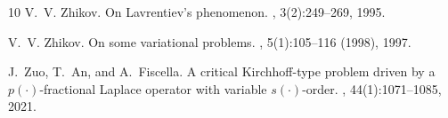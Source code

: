 \documentclass[11pt]{amsart}
\theoremstyle{plain}
\theoremstyle{definition}
\numberwithin{equation}{section}
\begin{document}
\begin{thebibliography}{10}
V.~V. Zhikov.
\newblock On {L}avrentiev's phenomenon.
, 3(2):249--269, 1995.

V.~V. Zhikov.
\newblock On some variational problems.
, 5(1):105--116 (1998), 1997.

J.~Zuo, T.~An, and A.~Fiscella.
\newblock A critical {K}irchhoff-type problem driven by a
  {$p(\cdot)$}-fractional {L}aplace operator with variable {$s(\cdot)$}-order.
, 44(1):1071--1085, 2021.

\end{thebibliography}
\end{document}
